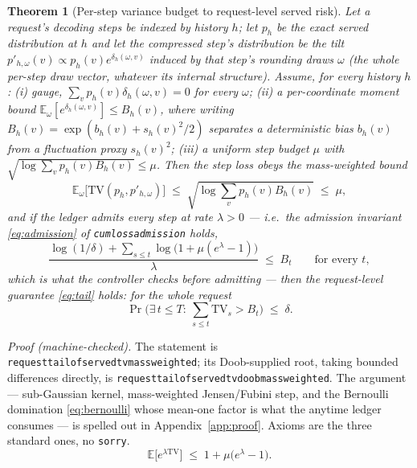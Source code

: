 \documentclass[11pt]{article}
\renewcommand{\_}{\WCorigunderscore\allowbreak}
\newtheorem{theorem}{Theorem}
\begin{document}
\begin{theorem}[Per-step variance budget to request-level served risk]
\label{thm:main}
Let a request's decoding steps be indexed by history $h$; let $p_h$ be
the exact served distribution at $h$ and let the compressed step's
distribution be the tilt $p'_{h,\omega}(v)\propto p_h(v)
e^{\delta_h(\omega,v)}$ induced by that step's rounding draws $\omega$
(the whole per-step draw vector, whatever its internal structure).
Assume, \emph{for every history $h$}:
\emph{(i)} gauge, $\sum_v p_h(v)\delta_h(\omega,v)=0$ for every $\omega$;
\emph{(ii)} a per-coordinate moment bound
$\mathbb{E}_\omega[e^{\delta_h(\omega,v)}]\le B_h(v)$, where writing
$B_h(v)=\exp(b_h(v)+s_h(v)^2/2)$ separates a \emph{deterministic bias}
$b_h(v)$ from a fluctuation proxy $s_h(v)^2$;
\emph{(iii)} a uniform step budget $\mu$ with
$\sqrt{\log\sum_v p_h(v)B_h(v)}\le\mu$.
Then the step loss obeys the mass-weighted bound
\begin{equation}\label{eq:step}
  \mathbb{E}_\omega\big[\mathrm{TV}(p_h,p'_{h,\omega})\big]
  \;\le\;\sqrt{\textstyle\log\sum_v p_h(v)B_h(v)}\;\le\;\mu ,
\end{equation}
and if the ledger admits every step at rate $\lambda>0$ --- i.e.\ the
admission invariant \eqref{eq:admission} of \texttt{cumloss\_admission}
holds,
\begin{equation}\label{eq:admission}
  \frac{\log(1/\delta)+\sum_{s\le t}\log\!\big(1+\mu(e^\lambda-1)\big)}
       {\lambda}\;\le\;B_t
  \qquad\text{for every }t,
\end{equation}
which is what the controller checks before admitting --- then the request-level guarantee \eqref{eq:tail} holds: for the
whole request
\begin{equation}\label{eq:tail}
  \Pr\Big(\exists\,t\le T:\ \textstyle\sum_{s\le t}\mathrm{TV}_s>B_t\Big)
  \;\le\;\delta .
\end{equation}
\end{theorem}



\noindent\emph{Proof (machine-checked).} The statement is
\texttt{request\_tail\_of\_served\_tv\_massweighted}; its Doob-supplied
root, taking bounded differences directly, is
\texttt{request\_tail\_of\_served\_tv\_doob\_massweighted}. The argument
--- sub-Gaussian kernel, mass-weighted Jensen/Fubini step, and the
Bernoulli domination \eqref{eq:bernoulli} whose mean-one factor is what
the anytime ledger consumes --- is spelled out in
Appendix~\ref{app:proof}. Axioms are the three standard ones, no
\texttt{sorry}.
\begin{equation}\label{eq:bernoulli}
  \mathbb{E}\big[e^{\lambda\mathrm{TV}}\big]\;\le\;1+\mu\big(e^\lambda-1\big).
\end{equation}
\end{document}
